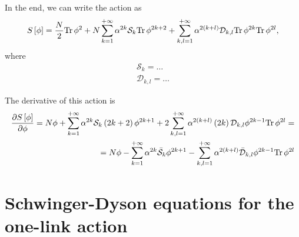 \documentclass[12pt]{article}
\newcommand{\lr}[1]{ \left( #1 \right) }
\newcommand{\lrs}[1]{ \left[ #1 \right] }
\newcommand{\tr}{ {\rm Tr} \, }
\begin{document}
In the end, we can write the action as
\begin{eqnarray}
\label{action_general}
 S\lrs{\phi} = \frac{N}{2} \tr{\phi^2}
 +
 N \sum\limits_{k=1}^{+\infty} \alpha^{2 k} \mathcal{S}_k \tr{\phi^{2 k + 2}}
 + %
 \sum\limits_{k,l=1}^{+\infty} \alpha^{2 \lr{k + l}} \mathcal{D}_{k,l} \tr{\phi^{2 k}} \tr{\phi^{2 l}} ,
\end{eqnarray}
where
\begin{eqnarray}
\label{vertices_explicit}
 \mathcal{S}_k = \ldots
 \nonumber \\
 \mathcal{D}_{k,l} = \ldots
\end{eqnarray}

The derivative of this action is
\begin{eqnarray}
\label{action_general_derivative}
 \frac{\partial S\lrs{\phi}}{\partial \phi} =
 N \phi
 +
 \sum\limits_{k=1}^{+\infty} \alpha^{2 k} \mathcal{S}_k \lr{2 k + 2} \phi^{2 k + 1}
 + %
 2 \sum\limits_{k,l=1}^{+\infty} \alpha^{2 \lr{k + l}} \lr{2 k} \mathcal{D}_{k,l} \phi^{2 k - 1} \tr{\phi^{2 l}}
 = \nonumber \\ =
 N \phi
 -
 \sum\limits_{k=1}^{+\infty} \alpha^{2 k} \bar{\mathcal{S}}_k \phi^{2 k + 1}
 - %
 \sum\limits_{k,l=1}^{+\infty} \alpha^{2 \lr{k + l}} \bar{\mathcal{D}}_{k,l} \phi^{2 k - 1} \tr{\phi^{2 l}}
\end{eqnarray}

\section{Schwinger-Dyson equations for the one-link action}
\end{document}

